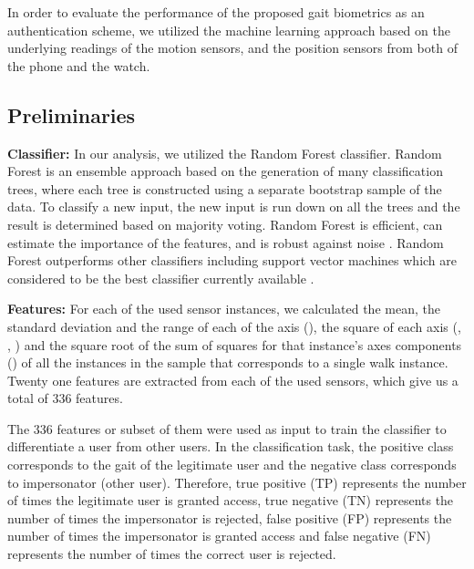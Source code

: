 



\vspace{-1mm}
In order to evaluate the performance of the proposed gait biometrics as
an authentication scheme, we utilized the machine learning approach based on
the underlying readings of the motion sensors, and the position sensors from both of the phone and the watch. 

\vspace{-4mm}
\subsection{Preliminaries}
\vspace{-2mm}
\noindent\textbf{Classifier:} In our analysis, we utilized the Random Forest classifier. Random Forest is an ensemble approach based on the generation of many
classification trees, where each tree is constructed using a separate bootstrap
sample of the data. To classify a new input, the new input is run down on
all the trees and the result is determined based on majority voting. Random Forest is efficient, can estimate the
importance of the features, and is robust against noise \cite{maxion2010keystroke}. 
Random Forest outperforms other classifiers including support vector machines which are considered to be the best classifier currently available \cite{caruana2006empirical,liu2013comparison,maxion2010keystroke}.
 
\smallskip
\noindent\textbf{Features:} For each of the used sensor
instances, we calculated the mean, the standard deviation and the range of each of the axis (), the square of each axis (, , ) and the square root of the sum of squares for that
instance's axes components () of
all the instances in the sample that corresponds to a single walk instance. Twenty one features are extracted from each of the used sensors, which give us a total of 336 features.


The 336 features or subset of them were used as input to train the classifier to
differentiate a user from other users.  
In the classification task, the positive class corresponds to the gait
of the legitimate user and the negative class corresponds to impersonator (other user).
Therefore, true positive (TP) represents the number of times the legitimate
user is granted access, true negative (TN) represents the number of times
the impersonator is rejected, false positive (FP) represents the number of
times the impersonator is granted access and false negative (FN) represents the
number of times the correct user is rejected.

